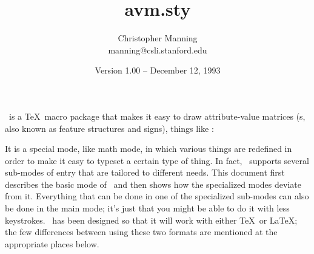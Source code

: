 

\title{{\sf avm.sty}}
\author{Christopher Manning\\{\ssf manning@csli.stanford.edu}}
\date{Version 1.00 -- December 12, 1993}


\maketitle

\av\ is a \TeX\ macro package that makes it easy to draw attribute-value
matrices ({\AVM}s, also known as feature structures and signs), things like
: 
%
\begin{example}
\begin{avm}
\end{avm}
\end{example}
%
It is a special
mode, like math mode, in which various things are redefined in order to
make it easy to typeset a certain type of thing.  In fact, \av\
supports several sub-modes of {\AVM} entry that are tailored to different
needs.  This document first describes the basic mode of \av\ and then shows
how the specialized modes deviate from it.  Everything that can be done in
one of the specialized sub-modes can also be done in the main mode; it's
just that you might be able to do it with less keystrokes.  \av\ has
been designed so that it will work with either \TeX\ or \LaTeX; the few
differences between using these two formats are mentioned at the
appropriate places below.

